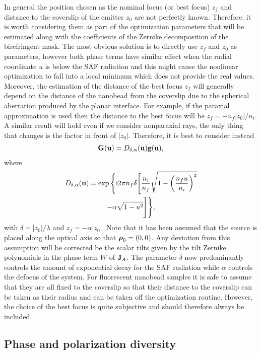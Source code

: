 \documentclass[reprint,aps,pra,superscriptaddress,
amsmath,amssymb]{revtex4-1}
\begin{document}
In general the position chosen as the nominal focus (or best focus) $z_f$ and 
distance to the coverslip of the emitter $z_0$ are not perfectly 
known. Therefore,
it is worth considering them as part of the optimization parameters that 
will be estimated along with the coefficients of the Zernike decomposition 
of the birefringent mask. The most obvious solution is to directly 
use $z_f$ and $z_0$ as parameters, however both phase 
terms have similar effect when the 
radial coordinate $u$ is below the SAF radiation and this might cause the 
nonlinear optimization to fall into a local minimum which does not provide
the real values.
Moreover, the estimation 
of the distance of the best focus $z_f$ will generally depend on the distance 
of the nanobead from the coverslip due to the spherical aberration
produced by the planar interface. For example, if the paraxial 
approximation is used then the distance to the best focus will be 
$z_f = -n_f |z_0| /n_i$. A similar result will hold even if we consider 
nonparaxial rays, the only thing that changes 
is the factor in front of $|z_0|$. Therefore, it is best to 
consider instead
\begin{align}
\textbf G (\textbf u)  = D_{\delta, \alpha} (\textbf u) \textbf g(\textbf u),
\end{align}
where
\begin{multline}
D_{\delta, \alpha} (\textbf u)= \exp \Bigg\{  
  \text{i} 2 \pi n_f  \delta \Bigg[ \frac{n_i}{n_f} 
  \sqrt{1 - \left(\frac{n_f u}{n_i} \right)^2 }  \\
- \alpha \sqrt{1 - u^2} \Bigg] \Bigg\} , 
\end{multline}
with $\delta = |z_0| / \lambda$ and $z_f = -\alpha |z_0|$. 
Note that it has been assumed that the source is placed  
along the optical axis so that $\boldsymbol \rho_0 = (0,0)$. 
Any deviation from this assumption will be corrected be the scalar tilts 
given by the tilt Zernike polynomials in the phase term $W$ of $\textbf J_A$.
The parameter $\delta$ now predominantly controls the amount of exponential 
decay for the SAF radiation while $\alpha$ controls the defocus of the system. 
For fluorescent nanobead samples it is safe to 
assume that they are all fixed to the coverslip so that their distance to the 
coverslip can be taken as their radius and can be taken off the optimization
routine.  However, the choice of the best focus is quite subjective and should 
therefore always be included.


\subsection{Phase and polarization diversity}
\end{document}
